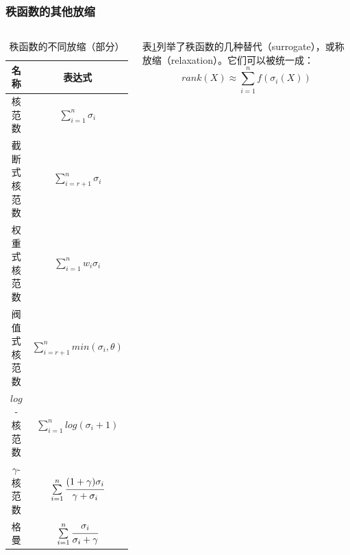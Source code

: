 \documentclass[10pt,aspectratio=43,mathserif]{beamer}
\begin{document}
\begin{frame}
\frametitle{\textbf{秩函数的其他放缩}}
\begin{columns}
\begin{table}[H]
\centering
\caption{秩函数的不同放缩（部分）}
\label{relaxation}
	
\begin{tabular}{c c}
\toprule
{\small{名称}}&{\small{表达式}}\\
\toprule
{\small{核范数}}&{\small{$\sum\limits_{i=1}^{n}\sigma_i$}}\\
\hline
{\small{截断式核范数}}&{\small{$\sum\limits_{i=r+1}^{n}\sigma_i$}}\\
\hline
{\small{权重式核范数}}&{\small{$\sum\limits_{i=1}^{n}w_i\sigma_i$}}\\
\hline
{\small{阀值式核范数}}&{\small{$\sum\limits_{i=r+1}^{n}min(\sigma_i, \theta)$}}\\
\hline
{\small{$log$-核范数}}&{\small{$\sum\limits_{i=1}^{n}log(\sigma_i+1)$}}\\
\hline
{\small{$\gamma$-核范数}}&{\small{$\sum\limits_{i=1}^{n}\cfrac{(1+\gamma)\sigma_i}{\gamma+\sigma_i}$}}\\
\hline
{\small{格曼}}&{\small{$\sum\limits_{i=1}^{n}\cfrac{\sigma_i}{\sigma_i + \gamma}$}}\\
\bottomrule
\end{tabular}
\end{table}
\par 表\ref{relaxation}列举了秩函数的几种替代（surrogate），或称放缩（relaxation）。它们可以被统一成：
\begin{displaymath}
rank(X) \approx \sum\limits_{i=1}^{n}f(\sigma_i(X))
\end{displaymath}
\end{columns}
\end{frame}
\end{document}

